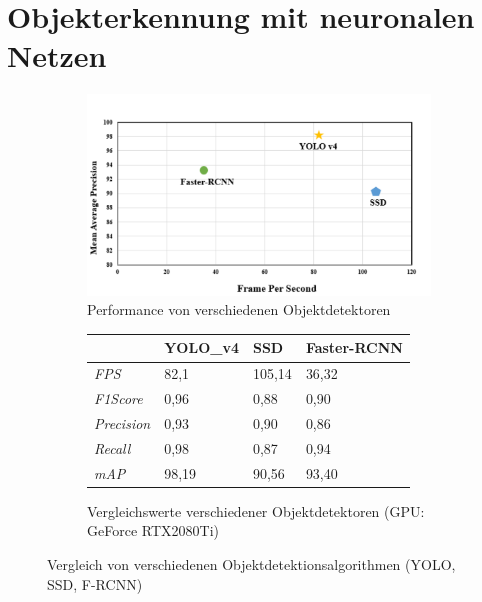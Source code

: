 \chapter{Objekterkennung mit neuronalen Netzen}
\label{ch:Theoretischer Hintergrund}



{
	\begin{figure}[ht]
        \centering
		\begin{subfigure}[b]{0.45\textwidth}
            \centering
            \includegraphics[width=\linewidth]{images/yolo_comp/Yolo_ssd_fRCNN.png}
            \caption[Performance von verschiedenen Objektdetektoren]{Performance von verschiedenen Objektdetektoren  \cite{Kim2020_2}}
            \label{Scr:Perf_ObDet}
        \end{subfigure} 
		\hfill
		\begin{subfigure}[b]{0.50\textwidth}
			\begin{tabular}{l|l|l|l} 	
			 & \textbf{YOLO\_v4} & \textbf{SSD} & \textbf{Faster-RCNN} \\ \hline
			\textit{FPS} & 82,1 & 105,14 & 36,32 \\ \hline
			\textit{F1Score} & 0,96 & 0,88 & 0,90 \\ \hline
			\textit{Precision} & 0,93 & 0,90 & 0,86 \\ \hline
			\textit{Recall} & 0,98 & 0,87 & 0,94 \\ \hline
			\textit{mAP} & 98,19 & 90,56 & 93,40
			\end{tabular}
			\vspace{0,65cm}
			\caption[Vergleichswerte verschiedener Objektdetektoren]{Vergleichswerte verschiedener Objektdetektoren (GPU: GeForce RTX2080Ti) \citep{Kim2020_2}}
			\label{tab:comp_Objdetect}
	\end{subfigure}      
        \caption[Vergleich von verschiedenen Objektdetektionsalgorithmen (YOLO, SSD, F-RCNN)]{Vergleich von verschiedenen Objektdetektionsalgorithmen (YOLO, SSD, F-RCNN) \cite{Kim2020_2}}
    \end{figure}
	
}
